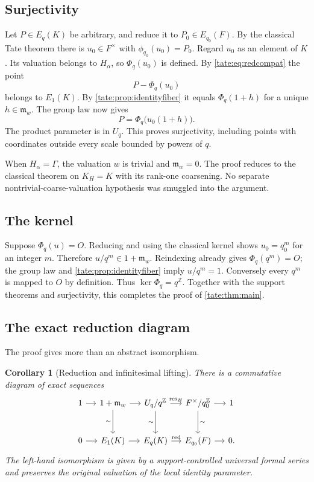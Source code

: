 \documentclass[11pt,letterpaper]{article}
\newtheorem{corollary}[corollary]{Corollary}
\theoremstyle{definition}
\newcommand{\Z}{\mathbb Z}
\newcommand{\res}{\operatorname{res}}
\newcommand{\m}{\mathfrak m}
\begin{document}
\subsection{Surjectivity}

Let $P\in E_q(K)$ be arbitrary, and reduce it to $P_0\in E_{q_0}(F)$.
By the classical Tate theorem there is $u_0\in F^\times$ with
$\phi_{q_0}(u_0)=P_0$. Regard $u_0$ as an element of $K$. Its valuation
belongs to $H_\alpha$, so $\Phi_q(u_0)$ is defined. By
\eqref{tate:eq:redcompat} the point
\[
 P-\Phi_q(u_0)
\]
belongs to $E_1(K)$. By \cref{tate:prop:identityfiber} it equals
$\Phi_q(1+h)$ for a unique $h\in\m_w$. The group law now gives
\[
 P=\Phi_q\bigl(u_0(1+h)\bigr).
\]
The product parameter is in $U_q$. This proves surjectivity, including
points with coordinates outside every scale bounded by powers of $q$.

When $H_\alpha=\Gamma$, the valuation $w$ is trivial and
$\m_w=0$. The proof reduces to the classical theorem on $K_H=K$
with its rank-one coarsening. No separate nontrivial-coarse-valuation
hypothesis was smuggled into the argument.

\subsection{The kernel}

Suppose $\Phi_q(u)=O$. Reducing and using the classical kernel shows
$u_0=q_0^m$ for an integer $m$. Therefore $u/q^m\in1+\m_w$.
Reindexing already gives $\Phi_q(q^m)=O$; the group law and
\cref{tate:prop:identityfiber} imply $u/q^m=1$. Conversely every $q^m$
is mapped to $O$ by definition. Thus $\ker\Phi_q=q^\Z$.
Together with the support theorems and surjectivity, this completes
the proof of \cref{tate:thm:main}.

\subsection{The exact reduction diagram}

The proof gives more than an abstract isomorphism.

\begin{corollary}[Reduction and infinitesimal lifting]\label{tate:cor:diagram}
There is a commutative diagram of exact sequences
\[
\begin{tikzcd}[column sep=small,row sep=large]
1\arrow[r]&1+\m_w\arrow[r]\arrow[d,"\sim"']&U_q/q^\Z
 \arrow[r,"\res_H"]\arrow[d,"\sim"']&F^\times/q_0^\Z
 \arrow[r]\arrow[d,"\sim"]&1\\
0\arrow[r]&E_1(K)\arrow[r]&E_q(K)\arrow[r,"\mathrm{red}"]&E_{q_0}(F)
 \arrow[r]&0 .
\end{tikzcd}
\]
The left-hand isomorphism is given by a support-controlled universal
formal series and preserves the original valuation of the local
identity parameter.
\end{corollary}
\end{document}
